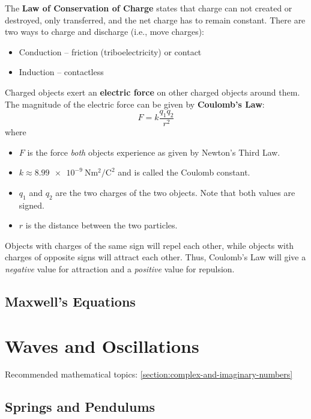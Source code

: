 \documentclass[a4paper, titlepage]{book}
\numberwithin{equation}{section}
\begin{document}
The \textbf{Law of Conservation of Charge} states that charge can not created or destroyed,
only transferred,
and the net charge has to remain constant.
There are two ways to charge and discharge (i.e., move charges):
\begin{itemize}
    \item Conduction -- friction (triboelectricity) or contact
    \item Induction -- contactless
\end{itemize}

Charged objects exert an \textbf{electric force} on other charged objects around them.
The magnitude of the electric force can be given by \textbf{Coulomb's Law}:
\begin{equation}
    F = k\frac{q_1 q_2}{r^2}
\end{equation}
where
\begin{itemize}
    \item \(F\) is the force \emph{both} objects experience as given by Newton's Third Law.
    \item \(k \approx \qty{8.99e-9}{\newton \meter\squared \per \coulomb\squared}\)
          and is called the Coulomb constant.
    \item \(q_1\) and \(q_2\) are the two charges of the two objects.
          Note that both values are signed.
    \item \(r\) is the distance between the two particles.
\end{itemize}
Objects with charges of the same sign will repel each other,
while objects with charges of opposite signs will attract each other.
Thus, Coulomb's Law will give a \emph{negative} value for attraction
and a \emph{positive} value for repulsion.

\chapter{Maxwell's Equations}


\part{Waves and Oscillations} \label{part:waves-and-oscillations}

Recommended mathematical topics: \ref{section:complex-and-imaginary-numbers}

\chapter{Springs and Pendulums}
\end{document}
